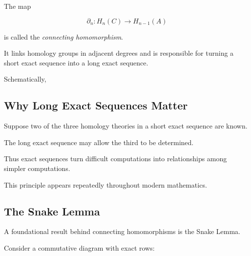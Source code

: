 The map

\[ \partial_n:H_n(C)\to H_{n-1}(A) \]

is called the \emph{connecting homomorphism}.

It links homology groups in adjacent degrees and is responsible for turning
a short exact sequence into a long exact sequence.

Schematically,

\begin{center}
\end{center}

\subsection{Why Long Exact Sequences Matter}
\label{subsec:why-long-exact}

Suppose two of the three homology theories in a short exact sequence are
known.

The long exact sequence may allow the third to be determined.

Thus exact sequences turn difficult computations into relationships among
simpler computations.

This principle appears repeatedly throughout modern mathematics.

\subsection{The Snake Lemma}
\label{subsec:snake-lemma}

A foundational result behind connecting homomorphisms is the Snake Lemma.

Consider a commutative diagram with exact rows:

\begin{center}
\end{center}


